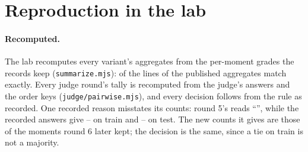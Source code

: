 \documentclass[11pt]{article}
\begin{document}
\begin{table}[!htbp]
\centering\footnotesize
\RebuiltTable
\caption{A round graded on rebuilt documents, beside its base on the same documents, on the
\Games{} games: moments graded 1, with one number where the round and its base agree. v17 is round
17's first wording, v17b its last, and v17c the last with the folded note's numbers; v22 is round
22's first wording and v22b its last. Table~\ref{tab:rebuilt-endgames} has the endgame sets.}
\label{tab:rebuilt}
\end{table}

\begin{table}[!htbp]
\centering\footnotesize
\RebuiltEndgameTable
\caption{Table~\ref{tab:rebuilt} on the endgame sets. Here the endgame set: rounds 16 to 29 (rounds
18 to 29 on all its key moments, the others on its endgame moments). The second endgame set
follows.}
\label{tab:rebuilt-endgames}
\end{table}

\begin{table}[!htbp]
\ContinuedFloat
\centering\footnotesize
\RebuiltEndgameTwoTable
\caption{Table~\ref{tab:rebuilt} on the endgame sets, continued: rounds 18 to 29 on the second
endgame set, drawn for round 18.}
\end{table}

\begin{table}[!htbp]
\centering\footnotesize
\DefectsTable
\caption{The text defects round 11 fixes, counted in each variant's texts on every moment of round
10's rebuilt documents (\texttt{defects.mjs}).}
\label{tab:defects}
\end{table}

\begin{table}[!htbp]
\centering\footnotesize
\DefectsFourteenTable
\caption{The text defects round 14 fixes, counted in its base's texts and round 14's
on every moment of round 13's documents (\texttt{defects.mjs}), with round 11's five beside them.}
\label{tab:defectsfourteen}
\end{table}

\section{Reproduction in the lab}
\label{sec:repro}

\paragraph{Recomputed.} The lab recomputes every variant's aggregates from the per-moment grades
the records keep (\texttt{summarize.mjs}): \ReproLinesMatched{} of the \ReproLines{} lines of the
published aggregates match exactly. Every judge round's tally is recomputed from the judge's
answers and the order keys (\texttt{judge/pairwise.mjs}), and every decision follows from the
rule as recorded. One recorded reason misstates its counts: round 5's reads ``\RoundFiveReason'',
while the recorded answers give \RoundFiveTrainNew--\RoundFiveTrainOld{} on train and
\RoundFiveTestNew--\RoundFiveTestOld{} on test. The new counts it gives are those of the moments
round 6 later kept; the decision is the same, since a tie on train is not a majority.
\end{document}
